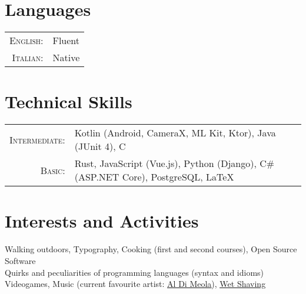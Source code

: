 \documentclass[a4paper,10pt]{article} %
\begin{document}

\section{Languages}

\begin{tabular}{rl}
\textsc{English:} & Fluent\\
\textsc{Italian:} & Native\\
\end{tabular}


\section{Technical Skills}

\begin{tabular}{rl}
\textsc{Intermediate:} & Kotlin \footnotesize(Android, CameraX, ML Kit, Ktor)\normalsize, Java \footnotesize(JUnit 4)\normalsize, C\\
\textsc{Basic:} & Rust, JavaScript \footnotesize(Vue.js)\normalsize, Python \footnotesize(Django)\normalsize, C\# \footnotesize(ASP.NET Core)\normalsize, PostgreSQL, {\sffamily\LaTeX}\setmainfont[SmallCapsFont=Fontin SmallCaps]{Fontin-Regular}\\

\end{tabular}


\section{Interests and Activities}

Walking outdoors, Typography, Cooking \footnotesize(first and second courses)\normalsize, Open Source Software\\
Quirks and peculiarities of programming languages \footnotesize(syntax and idioms)\normalsize\\
Videogames, Music \footnotesize(current favourite artist: \href{https://youtu.be/tsmThCBkBUo}{\underline{Al Di Meola}})\normalsize, \href{https://youtu.be/NRf48k8f-Yc}{\underline{Wet Shaving}}

\end{document}
